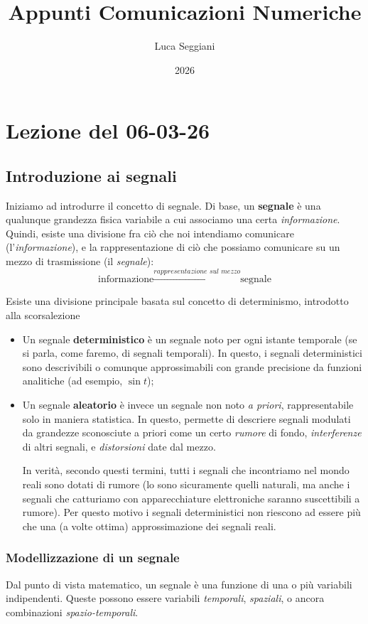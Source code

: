 \documentclass[a4paper,11pt]{article}
\title{Appunti Comunicazioni Numeriche}
\author{Luca Seggiani}
\date{2026}
\begin{document}
\section{Lezione del 06-03-26}

\thispagestyle{empty}
\pagestyle{fancy}

\subsection{Introduzione ai segnali}
Iniziamo ad introdurre il concetto di segnale. Di base, un \textbf{segnale} è una qualunque grandezza fisica variabile a cui associamo una certa \textit{informazione}.
Quindi, esiste una divisione fra ciò che noi intendiamo comunicare (l'\textit{informazione}), e la rappresentazione di ciò che possiamo comunicare su un mezzo di trasmissione (il \textit{segnale}):
$$
\text{informazione} \xrightarrow{\textit{rappresentazione sul mezzo}} \text{segnale}
$$

\newpage

Esiste una divisione principale basata sul concetto di determinismo, introdotto alla scorsalezione 
\begin{itemize}
	\item Un segnale \textbf{deterministico} è un segnale noto per ogni istante temporale (se si parla, come faremo, di segnali temporali). In questo, i segnali deterministici sono descrivibili o comunque approssimabili con grande precisione da funzioni analitiche (ad esempio, $\sin{t}$);
	\item Un segnale \textbf{aleatorio} è invece un segnale non noto \textit{a priori}, rappresentabile solo in maniera statistica. In questo, permette di descriere segnali modulati da grandezze sconosciute a priori come un certo \textit{rumore} di fondo, \textit{interferenze} di altri segnali, e \textit{distorsioni} date dal mezzo. 
	
		In verità, secondo questi termini, tutti i segnali che incontriamo nel mondo reali sono dotati di rumore (lo sono sicuramente quelli naturali, ma anche i segnali che catturiamo con apparecchiature elettroniche saranno suscettibili a rumore). Per questo motivo i segnali deterministici non riescono ad essere più che una (a volte ottima) approssimazione dei segnali reali.
\end{itemize}

\subsubsection{Modellizzazione di un segnale}
Dal punto di vista matematico, un segnale è una funzione di una o più variabili indipendenti. Queste possono essere variabili \textit{temporali}, \textit{spaziali}, o ancora combinazioni \textit{spazio-temporali}.
\end{document}
